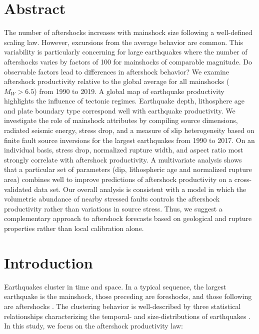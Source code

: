 \documentclass[draft, jgrga]{agujournal2018}
\begin{document}
\justify

\section*{Abstract}

The number of aftershocks increases with mainshock size following a well-defined scaling law. However, excursions from the average behavior are common. This variability is particularly concerning for large earthquakes where the number of aftershocks varies by factors of 100 for mainshocks of comparable magnitude. Do observable factors lead to differences in aftershock behavior? We examine aftershock productivity relative to the global average for all mainshocks ($M_W>6.5$) from 1990 to 2019. A global map of earthquake productivity highlights the influence of tectonic regimes. Earthquake depth, lithosphere age and plate boundary type correspond well with earthquake productivity. We investigate the role of mainshock attributes by compiling source dimensions, radiated seismic energy, stress drop, and a measure of slip heterogeneity based on finite fault source inversions for the largest earthquakes from 1990 to 2017. On an individual basis, stress drop, normalized rupture width, and aspect ratio most strongly correlate with aftershock productivity. A multivariate analysis shows that a particular set of parameters (dip, lithospheric age and normalized rupture area) combines well to improve predictions of aftershock productivity on a cross-validated data set. Our overall analysis is consistent with a model in which the volumetric abundance of nearby stressed faults controls the aftershock productivity rather than variations in source stress. Thus, we suggest a complementary approach to aftershock forecasts based on geological and rupture properties rather than local calibration alone.

\section{Introduction}

Earthquakes cluster in time and space. In a typical sequence, the largest earthquake is the mainshock, those preceding are foreshocks, and those following are aftershocks \citep{Omori1895}. The clustering behavior is well-described by three statistical relationships characterizing the temporal- and size-distributions of earthquakes \citep[e.g.,][]{Ogata1988}. In this study, we focus on the aftershock productivity law:
\end{document}
